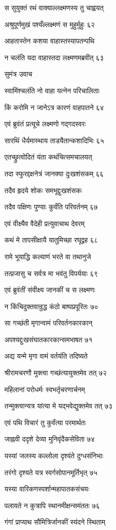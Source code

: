 स सुयुक्तं रथं वाक्याल्लक्ष्मणस्य तु चाह्वयत्

अश्रुपूर्णमुखं पश्यँल्लक्ष्मणं स मुहुर्मुहुः ६२

आहतास्तेन कशया वाहास्तस्यापतन्पथि

न चलंति यदा वाहास्तदा लक्ष्मणमब्रवीत् ६३

सुमंत्र उवाच

स्वामिंश्चलंति नो वाहा यत्नेन परिचालिताः

किं करोमि न जानेऽत्र कारणं वाहपातने ६४

एवं ब्रुवंतं प्रत्यूचे लक्ष्मणो गद्गदस्वरः

सारथिं धैर्यमास्थाय ताडयैतान्कशादिभिः ६५

एतच्छ्रुत्वोदितं यंता कथंचित्समचालयत्

तदा स्फुरद्दक्षनेत्रं जानक्या दुःखशंसकम् ६६

तदैव हृदये शोकः समभूद्दुःखशंसकः

तदैव पक्षिणः पुण्याः कुर्वंति परिवर्तनम् ६७

एवं वीक्ष्यैव वैदेही प्रत्युवाचाथ देवरम्

कथं मे तापसीक्षायै यातुमिच्छा रघूद्वह ६८

रामे भूयाद्धि कल्याणं भरते वा तथानुजे

तत्प्रजासु च सर्वत्र मा भवंतु विपर्ययाः ६९

एवं ब्रुवंतीं संवीक्ष्य जानकीं च स लक्ष्मणः

न किंचिदुक्तवान्रुद्ध कंठो बाष्पप्रपूरितः ७०

सा गच्छंती मृगान्वामं परिवर्तनकारकान्

अपश्यद्दुःखसंघातकारकान्समभाषत ७१

अद्य यन्मे मृगा वामं वर्तयंति तदिष्यते

श्रीरामचरणौ मुक्त्वा गच्छंत्यायुक्तमेव तत् ७२

महिलानां परोधर्मः स्वभर्तृचरणार्चनम्

तन्मुक्त्वान्यत्र यांत्या मे यद्भवेद्युक्तमेव तत् ७३

एवं पथि विचारं तु कुर्वंत्या परमार्थतः

जाह्नवी ददृशे देव्या मुनिवृंदैकसेविता ७४

यस्यां जलस्य कल्लोला दृश्यंते दुग्धसंनिभाः

तरंगो दृश्यते यत्र स्वर्गसोपानमूर्तिभृत् ७५

यस्या वारिकणस्पर्शान्महापातकसंचयः

पलायते न कुत्रापि स्थानमीक्षन्समंततः ७६

गंगां प्राप्याथ सौमित्रिर्जानकीं स्यंदने स्थिताम्

